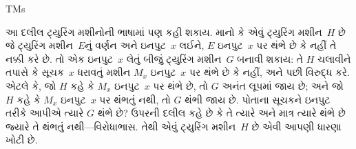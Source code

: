 \documentclass[../../../include/open-logic-section]{subfiles}
\begin{document}
\begin{tagblock}{TMs}
\begin{explain}
આ દલીલ ટ્યુરિંગ મશીનોની ભાષામાં પણ કહી શકાય. માનો કે એવું
ટ્યુરિંગ મશીન~$H$ છે જે ટ્યુરિંગ મશીન~$E$નું વર્ણન અને ઇનપુટ~$x$
લઈને, $E$ ઇનપુટ~$x$ પર થંભે છે કે નહીં તે નક્કી કરે છે.
તો એક ઇનપુટ~$x$ લેતું બીજું ટ્યુરિંગ મશીન~$G$ બનાવી શકાય:
તે $H$ ચલાવીને તપાસે કે સૂચક~$x$ ધરાવતું મશીન $M_x$
ઇનપુટ~$x$ પર થંભે છે કે નહીં, અને પછી વિરુદ્ધ કરે. એટલે કે,
જો $H$ કહે કે $M_x$ ઇનપુટ~$x$ પર થંભે છે, તો $G$ અનંત લૂપમાં
જાય છે; અને જો $H$ કહે કે $M_x$ ઇનપુટ~$x$ પર થંભતું નથી,
તો $G$ થંભી જાય છે. પોતાના સૂચકને ઇનપુટ તરીકે આપીએ ત્યારે
$G$ થંભે છે? ઉપરની દલીલ કહે છે કે તે ત્યારે અને માત્ર ત્યારે
થંભે છે જ્યારે તે થંભતું નથી---વિરોધાભાસ. તેથી એવું ટ્યુરિંગ
મશીન~$H$ છે એવી આપણી ધારણા ખોટી છે.
\end{explain}
\end{tagblock}
\end{document}
